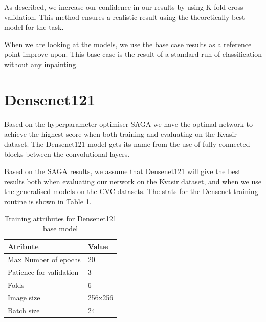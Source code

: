 As described, we increase our confidence in our results by using K-fold cross-validation. This method ensures a realistic result using the theoretically best model for the task. 

When we are looking at the models, we use the base case results as a reference point improve upon. This base case is the result of a standard run of classification without any inpainting.


\FloatBarrier
\section{Densenet121}


Based on the hyperparameter-optimiser SAGA we have the optimal network to achieve the highest score when both training and evaluating on the Kvasir dataset. 
The Densenet121 model gets its name from the use of fully connected blocks between the convolutional layers. 

Based on the SAGA results, we assume that Densenet121 will give the best results both when evaluating our network on the Kvasir dataset, and when we use the generalised models on the CVC datasets.
The stats for the Densenet training routine is shown in Table \ref{tab:TrainingAttrDN121}.



\begin{table}[h]
\caption{Training attributes for Densenet121 base model }
\begin{center}
\begin{tabular}{ll}
\toprule
Atribute                & Value   \\
\midrule
Max Number of epochs    & 20      \\
Patience for validation & 3       \\
Folds                   & 6       \\
Image size              & 256x256 \\
Batch size              & 24      \\   
\bottomrule
\end{tabular}
\end{center}
\label{tab:TrainingAttrDN121}
\end{table}


